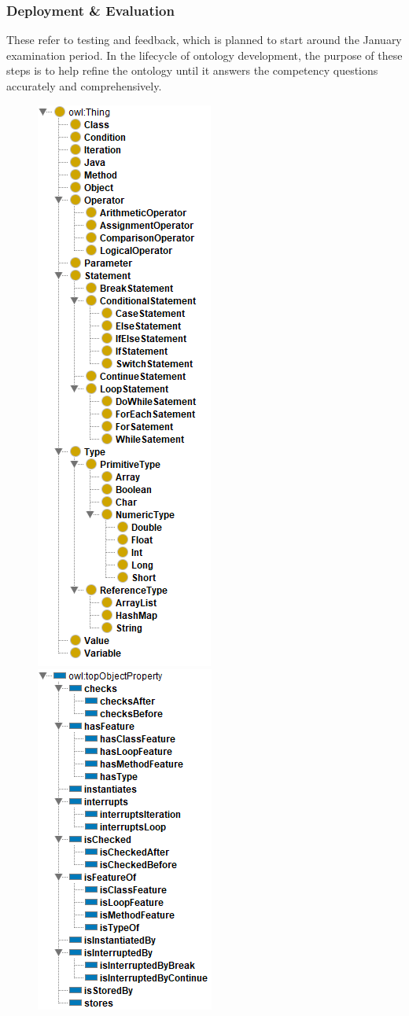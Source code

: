 \documentclass[titlepage]{article}
\begin{document}
\subsubsection{Deployment \& Evaluation}
These refer to testing and feedback, which is planned to start around the January examination period. In the lifecycle of ontology development, the purpose of these steps is to help refine the ontology until it answers the competency questions accurately and comprehensively.
\begin{figure}
    \includegraphics{classes.png}
    \includegraphics{properties.png}

\end{figure}
\end{document}
